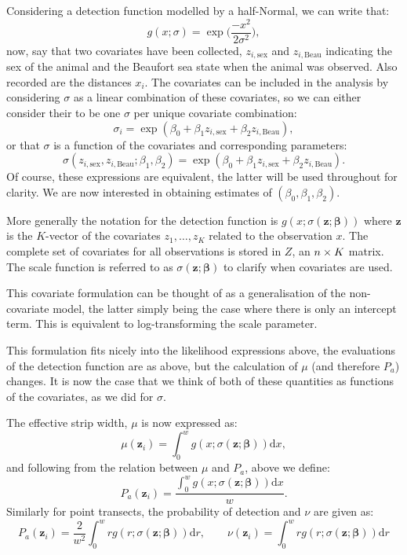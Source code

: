 Considering a detection function modelled by a half-Normal, we can write that:
\begin{equation}
g(x; \sigma) = \exp\Big(\frac{-x^2}{2\sigma^2}\Big),
\end{equation}
now, say that two covariates have been collected, $z_{i,\text{sex}}$ and $z_{i,\text{Beau}}$ indicating the sex of the animal and the Beaufort sea state when the animal was observed. Also recorded are the distances $x_i$. The covariates can be included in the analysis by considering $\sigma$ as a linear combination of these covariates, so we can either consider their to be one $\sigma$ per unique covariate combination:
\begin{equation}
\sigma_i = \exp( \beta_0 + \beta_1 z_{i,\text{sex}} + \beta_2 z_{i,\text{Beau}}),
\end{equation}
or that $\sigma$ is a function of the covariates and corresponding parameters:
\begin{equation}
\sigma(z_{i,\text{sex}}, z_{i,\text{Beau}}; \beta_1, \beta_2) = \exp(\beta_0 + \beta_1 z_{i,\text{sex}} + \beta_2 z_{i,\text{Beau}}).
\end{equation}
Of course, these expressions are equivalent, the latter will be used throughout for clarity. We are now interested in obtaining estimates of $(\beta_0, \beta_1, \beta_2)$.

More generally the notation for the detection function is $g(x ; \sigma(\bm{z}; \bm{\beta}))$ where $\bm{z}$ is the $K$-vector of the covariates $z_1, \dots, z_K$ related to the observation $x$. The complete set of covariates for all observations is stored in $Z$, an $n \times K$ matrix. The scale function is referred to as $\sigma(\bm{z}; \bm{\beta})$ to clarify when covariates are used.

This covariate formulation can be thought of as a generalisation of the non-covariate model, the latter simply being the case where there is only an intercept term. This is equivalent to log-transforming the scale parameter.

This formulation fits nicely into the likelihood expressions above, the evaluations of the detection function are as above, but the calculation of $\mu$ (and therefore $P_a$) changes. It is now the case that we think of both of these quantities as functions of the covariates, as we did for $\sigma$.

The effective strip width, $\mu$ is now expressed as:
\begin{equation}
\mu(\bm{z}_i) = \int_0^w g(x ; \sigma(\bm{z}; \bm{\beta})) \text{d}x,
\end{equation}
and following from the relation between $\mu$ and $P_a$, above we define:
\begin{equation}
P_a(\bm{z}_i) = \frac{\int_0^w g(x ; \sigma(\bm{z}; \bm{\beta})) \text{d}x}{w}.
\end{equation}
Similarly for point transects, the probability of detection and $\nu$ are given as:
\begin{equation}
P_a(\bm{z}_i) =\frac{2}{w^2}\int_0^w r g(r; \sigma(\bm{z}; \bm{\beta})) \text{d}r, \qquad \nu(\bm{z}_i) = \int_0^w r g(r; \sigma(\bm{z}; \bm{\beta})) \text{d}r
\end{equation}

